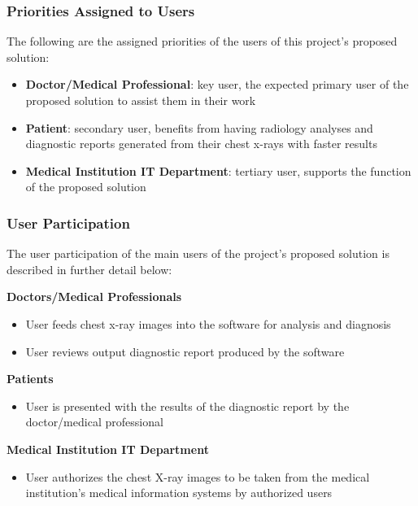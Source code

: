 \documentclass[12pt]{article}
\begin{document}
\subsubsection{Priorities Assigned to Users}
The following are the assigned priorities of the users of this project's proposed solution:
\begin{itemize}
    \item \textbf{Doctor/Medical Professional}: key user, the expected primary user of the proposed solution to assist them in their work
    \item \textbf{Patient}: secondary user, benefits from having radiology analyses and diagnostic reports generated from their chest x-rays with faster results
    \item \textbf{Medical Institution IT Department}: tertiary user, supports the function of the proposed solution
\end{itemize}

\subsubsection{User Participation}
The user participation of the main users of the project’s proposed solution is described in further detail below:
\begin{itemize}
    \begin{item}
        \textbf{Doctors/Medical Professionals}
        \begin{itemize}
            \item User feeds chest x-ray images into the software for analysis and diagnosis
            \item User reviews output diagnostic report produced by the software
        \end{itemize}
    \end{item}
    \begin{item}
        \textbf{Patients}
        \begin{itemize}
            \item User is presented with the results of the diagnostic report by the doctor/medical professional
        \end{itemize}
    \end{item}
    \begin{item}
        \textbf{Medical Institution IT Department}
        \begin{itemize}
            \item User authorizes the chest X-ray images to be taken from the medical institution’s medical information systems by authorized users
        \end{itemize}
    \end{item}
\end{itemize}
\end{document}
